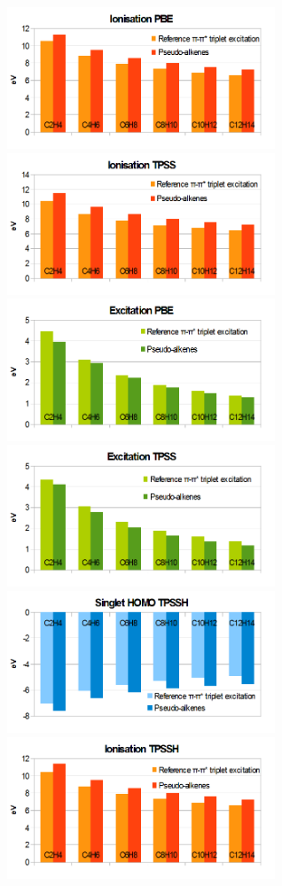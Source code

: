 \documentclass[journal=jctcce,manuscript=article]{achemso}
\begin{document}
\begin{figure}
\includegraphics[width=8cm]{pbe_ionisation}
\includegraphics[width=8cm]{tpss_ionisation}
\includegraphics[width=8cm]{pbe_excitation}
\includegraphics[width=8cm]{tpss_excitation}
\includegraphics[width=8cm]{tpssh_homo}
\includegraphics[width=8cm]{tpssh_ionisation}

\end{figure}
\end{document}
